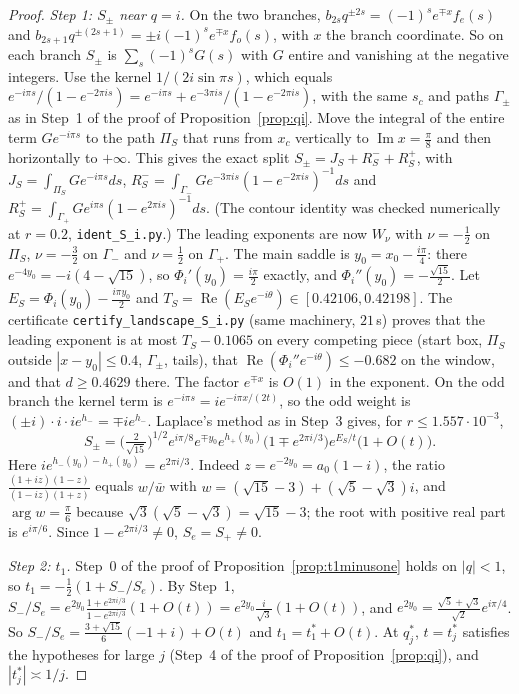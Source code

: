 \documentclass[11pt]{article}
\theoremstyle{plain}
\theoremstyle{definition}
\theoremstyle{remark}
\theoremstyle{plain}\newtheorem*{maintheorem}{Main Theorem}
\begin{document}
\begin{proof}
\emph{Step 1: $S_\pm$ near $q=i$.} On the two branches, $b_{2s}q^{\pm2s}=(-1)^se^{\mp x}f_e(s)$ and
$b_{2s+1}q^{\pm(2s+1)}=\pm i(-1)^se^{\mp x}f_o(s)$, with $x$ the branch coordinate. So on each branch
$S_\pm$ is $\sum_s(-1)^sG(s)$ with $G$ entire and vanishing at the negative integers. Use the kernel
$1/(2i\sin\pi s)$, which equals $e^{-i\pi s}/(1-e^{-2\pi is})=e^{-i\pi s}+e^{-3\pi is}/(1-e^{-2\pi is})$, with
the same $s_c$ and paths $\Gamma_\pm$ as in Step~1 of the proof of Proposition~\ref{prop:qi}. Move the
integral of the entire term $Ge^{-i\pi s}$ to the path $\Pi_S$ that runs from $x_c$ vertically to
$\operatorname{Im}x=\frac\pi8$ and then horizontally to $+\infty$. This gives the exact split
$S_\pm=J_S+R^-_S+R^+_S$, with $J_S=\int_{\Pi_S}Ge^{-i\pi s}ds$,
$R^-_S=\int_{\Gamma_-}Ge^{-3\pi is}(1-e^{-2\pi is})^{-1}ds$ and
$R^+_S=\int_{\Gamma_+}Ge^{i\pi s}(1-e^{2\pi is})^{-1}ds$. (The contour identity was checked numerically
at $r=0.2$, \texttt{ident\_S\_i.py}.) The leading exponents are now $W_\nu$ with $\nu=-\frac12$ on
$\Pi_S$, $\nu=-\frac32$ on $\Gamma_-$ and $\nu=\frac12$ on $\Gamma_+$. The main saddle is
$y_0=x_0-\frac{i\pi}4$: there $e^{-4y_0}=-i(4-\sqrt{15})$, so $\Phi_i'(y_0)=\frac{i\pi}2$ exactly, and
$\Phi_i''(y_0)=-\frac{\sqrt{15}}2$. Let $E_S=\Phi_i(y_0)-\frac{i\pi y_0}2$ and
$T_S=\operatorname{Re}(E_Se^{-i\theta})\in[0.42106,0.42198]$. The certificate
\texttt{certify\_landscape\_S\_i.py} (same machinery, $21$\,s) proves that the leading exponent is at most
$T_S-0.1065$ on every competing piece (start box, $\Pi_S$ outside $|x-y_0|\le0.4$, $\Gamma_\pm$, tails),
that $\operatorname{Re}(\Phi_i''e^{-i\theta})\le-0.682$ on the window, and that $d\ge0.4629$ there. The factor
$e^{\mp x}$ is $O(1)$ in the exponent. On the odd branch the kernel term is
$e^{-i\pi s}=ie^{-i\pi x/(2t)}$, so the odd weight is $(\pm i)\cdot i\cdot ie^{h_-}=\mp ie^{h_-}$. Laplace's
method as in Step~3 gives, for $r\le1.557\cdot10^{-3}$,
\[
   S_\pm=\bigl(\tfrac2{\sqrt{15}}\bigr)^{1/2}e^{i\pi/8}e^{\mp y_0}e^{h_+(y_0)}\bigl(1\mp e^{2\pi i/3}\bigr)e^{E_S/t}\bigl(1+O(t)\bigr).
\]
Here $ie^{h_-(y_0)-h_+(y_0)}=e^{2\pi i/3}$. Indeed $z=e^{-2y_0}=a_0(1-i)$, the ratio
$\frac{(1+iz)(1-z)}{(1-iz)(1+z)}$ equals $w/\bar w$ with $w=(\sqrt{15}-3)+(\sqrt5-\sqrt3)i$, and
$\arg w=\frac\pi6$ because $\sqrt3(\sqrt5-\sqrt3)=\sqrt{15}-3$; the root with positive real part is
$e^{i\pi/6}$. Since $1-e^{2\pi i/3}\ne0$, $S_e=S_+\ne0$.

\emph{Step 2: $t_1$.} Step~0 of the proof of Proposition~\ref{prop:t1minusone} holds on $|q|<1$, so
$t_1=-\frac12(1+S_-/S_e)$. By Step~1,
$S_-/S_e=e^{2y_0}\frac{1+e^{2\pi i/3}}{1-e^{2\pi i/3}}(1+O(t))=e^{2y_0}\frac i{\sqrt3}(1+O(t))$, and
$e^{2y_0}=\frac{\sqrt5+\sqrt3}{\sqrt2}e^{i\pi/4}$. So $S_-/S_e=\frac{3+\sqrt{15}}6(-1+i)+O(t)$ and
$t_1=t_1^\ast+O(t)$. At $q^\ast_j$, $t=t^\ast_j$ satisfies the hypotheses for large $j$ (Step~4 of the proof
of Proposition~\ref{prop:qi}), and $|t^\ast_j|\asymp1/j$.


\end{proof}
\end{document}

